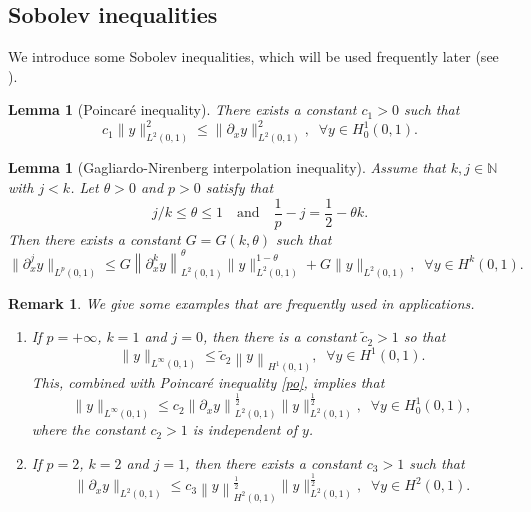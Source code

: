 \documentclass[review]{elsarticle}
\newtheorem{lemma}[theorem]{Lemma}
\newtheorem{remark}[theorem]{Remark}
\numberwithin{equation}{section}
\begin{document}
    \subsection{Sobolev inequalities}
    We introduce some Sobolev inequalities, which will be used frequently later  (see \cite[Chapter 13]{Brezis}).
    \begin{lemma}[Poincar\'{e} inequality]
\label{PO}
There exists a constant $c_1>0$ such that
    \begin{equation}
        \label{po}
c_1\|y\|^2_{L^2(0,1)} \le \|\partial_x y\|^2_{L^2(0,1)},\;\; \forall y\in H^1_0(0,1).
\end{equation}
\end{lemma}
\begin{lemma}[Gagliardo-Nirenberg interpolation inequality]
\label{g-n}
Assume that $k, j \in \mathbb{N}$ with $j<k$. Let $\theta>0$ and $p>0$ satisfy that
$$ j / k \leq \theta \leq 1\quad \text{and}\quad
\frac{1}{p}-j=\frac{1}{2}-\theta k.
$$
Then there exists a constant $G=G\left(k,\theta\right)$ such that
$$
\|\partial_x^j y\|_{L^p(0,1)} \leq G\left\|\partial_x^k y\right\|_{L^2(0,1)}^\theta\|y\|_{L^2(0,1)}^{1-\theta}+G\|y\|_{L^2(0,1)},\;\; \forall y \in H^{k}(0,1).
$$
\end{lemma}
\begin{remark}
    We give some examples that are frequently used in applications.
    \begin{enumerate}
        \item If $p=+\infty$,  $k=1$ and $j=0$, then there is a constant $\tilde{c}_2>1$ so that
        \begin{equation}
        \label{Agmon}
            \| y\|_{L^{\infty}(0,1)} \leq \tilde{c}_2\left\| y\right\|_{H^{1}(0,1)},\;\; \forall y\in H^1(0,1).
        \end{equation}
        This, combined with Poincar\'{e} inequality \eqref{po}, implies that 
        \begin{equation}
        \label{Agmon1}
            \| y\|_{L^{\infty}(0,1)} \leq c_2\left\|\partial_x y\right\|_{L^{2}(0,1)}^{\frac{1}{2}}\|y\|_{L^{2}(0,1)}^{\frac{1}{2}},\;\; \forall y\in H_0^1(0,1),
        \end{equation}
        where the constant $c_2>1$ is independent of $y$. 
         \item If $p=2$, $k=2$ and $j=1$, then there exists a constant $c_3>1$ such that
        \begin{equation}
        \label{interpolation}
            \|\partial_x y\|_{L^{2}(0,1)} \leq c_3\left\| y\right\|_{H^{2}(0,1)}^{\frac{1}{2}}\|y\|_{L^{2}(0,1)}^{\frac{1}{2}},\;\;\forall y\in H^2(0,1).
        \end{equation}
    \end{enumerate}
\end{remark}
\end{document}
